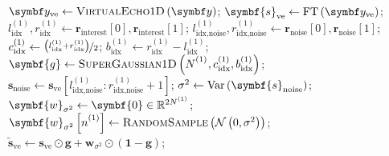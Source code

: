 \begin{algorithm}[h!]
    \begin{algorithmic}[1]
        \caption[
            Filtering procedure for 1D data.
        ]
        {
            Filtering procedure for 1D data.
            $\symbf{r}_{\text{interest}}$ is a vector of length 2 containing
            the indices of the left and right bounds of the region of interest.
            These would typically be provided in units of \unit{\hertz} or
            \unit{\partspermillion} by a user. Conversion to array indices can
            be carried out using \eqref{eq:fidx}.
            $\symbf{r}_{\text{noise}}$ contains the left and right bounds of
            the region used to estimate the noise variance.
            \textsc{RandomSample} indicates taking a random sample from the
            given distribution.
        }
        \label{alg:filter-1d}
            \State $\by_{\text{ve}} \gets \textsc{VirtualEcho$1$D}\left(\by\right)$;
            \State $\symbf{s}_{\text{ve}} \gets \FT\left(\by_{\text{ve}}\right)$;
            \State $l^{(1)}_{\text{idx}}, r^{(1)}_{\text{idx}} \gets \symbf{r}_{\text{interest}}[0], \symbf{r}_{\text{interest}}[1]$;
            \State $l^{(1)}_{\text{idx,noise}}, r^{(1)}_{\text{idx,noise}} \gets \symbf{r}_{\text{noise}}[0], \symbf{r}_{\text{noise}}[1]$;
            \State $c_{\text{idx}}^{(1)} \gets \nicefrac{\left(l_{\text{idx}}^{(1)} + r_{\text{idx}}^{(1)}\right)}{2}$;
            \State $b_{\text{idx}}^{(1)} \gets r_{\text{idx}}^{(1)} - l_{\text{idx}}^{(1)}$;
            \State $\symbf{g} \gets \textsc{SuperGaussian$1$D}\left(\None_{\vphantom{\text{idx}}}, c_{\text{idx}}^{(1)}, b_{\text{idx}}^{(1)}\right)$;
            \State $\symbf{s}_{\text{noise}} \gets \symbf{s}_{\text{ve}} \left[
                l^{(1)}_{\text{idx,noise}} : r^{(1)}_{\text{idx,noise}} + 1
            \right]
            $;
            \State $\sigma^2 \gets \Var\left(\symbf{s}_{\text{noise}}\right)$;
            \State $\symbf{w}_{\sigma^2} \gets \symbf{0} \in \mathbb{R}^{2\None}$;
                \State $\symbf{w}_{\sigma^2}\left[ \none \right] \gets \textsc{RandomSample}\left(\mathcal{N}\left(0, \sigma^2\right)\right)$;
            \EndFor
            \State $\widetilde{\symbf{s}}_{\text{ve}} \gets \symbf{s}_{\text{ve}} \odot \symbf{g} + \symbf{w}_{\sigma^2} \odot \left(\symbf{1} - \symbf{g}\right)$;

\end{algorithmic}
\end{algorithm}
